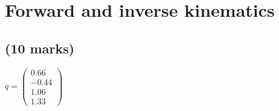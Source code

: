 \section{Forward and inverse kinematics}

\subsection{(10 marks)}

\begin{center}
    $ q =
    \begin{pmatrix}
         0.66 \\
        -0.44 \\
         1.06 \\
         1.33
    \end{pmatrix} $
\end{center}

